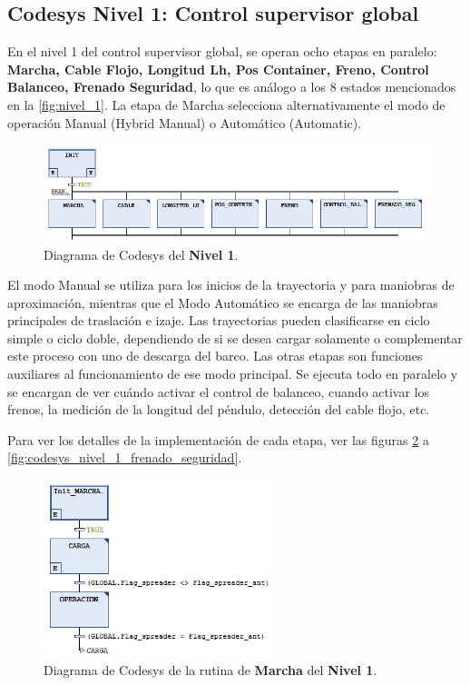 \documentclass[11pt]{article}
\begin{document}
\subsection{Codesys Nivel 1: Control supervisor global}

En el nivel 1 del control supervisor global, se operan ocho etapas en paralelo: \textbf{Marcha, Cable Flojo, Longitud Lh, Pos Container, Freno, Control Balanceo, Frenado Seguridad}, lo que es análogo a los 8 estados mencionados en la \ref{fig:nivel_1}. La etapa de Marcha selecciona alternativamente el modo de operación Manual (Hybrid Manual) o Automático (Automatic).

\begin{figure}[!h]
	\centering
	\includegraphics[width=1\textwidth]{images/imagen_29_codesys_nivel_1.png}
	\caption{Diagrama de Codesys del \textbf{Nivel 1}.}
	\label{fig:codesys_nivel_1}
\end{figure}

El modo Manual se utiliza para los inicios de la trayectoria y para maniobras de aproximación, mientras que el Modo Automático se encarga de las maniobras principales de traslación e izaje. Las trayectorias pueden clasificarse en ciclo simple o ciclo doble, dependiendo de si se desea cargar solamente o complementar este proceso con uno de descarga del barco. Las otras etapas son funciones auxiliares al funcionamiento de ese modo principal. Se ejecuta todo en paralelo y se encargan de ver cuándo activar el control de balanceo, cuando activar los frenos, la medición de la longitud del péndulo, detección del cable flojo, etc.

Para ver los detalles de la implementación de cada etapa, ver las figuras \ref{fig:codesys_nivel_1_marcha} a \ref{fig:codesys_nivel_1_frenado_seguridad}.

\begin{figure}[!h]
	\centering
	\includegraphics[width=0.6\textwidth]{images/imagen_30_codesys_nivel_1_marcha.png}
	\caption{Diagrama de Codesys de la rutina de \textbf{Marcha} del \textbf{Nivel 1}.}
	\label{fig:codesys_nivel_1_marcha}
\end{figure}
\end{document}
